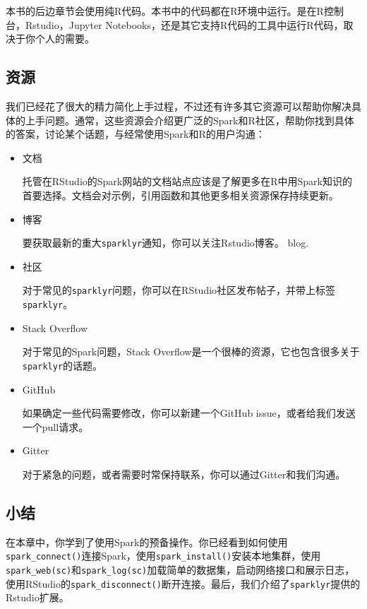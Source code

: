 \documentclass[
]{article}
\begin{document}
本书的后边章节会使用纯R代码。本书中的代码都在R环境中运行。是在R控制台，Rstudio，Jupyter
Notebooks，还是其它支持R代码的工具中运行R代码，取决于你个人的需要。

\hypertarget{ux8d44ux6e90}{%
\subsection{资源}\label{ux8d44ux6e90}}

我们已经花了很大的精力简化上手过程，不过还有许多其它资源可以帮助你解决具体的上手问题。通常，这些资源会介绍更广泛的Spark和R社区，帮助你找到具体的答案，讨论某个话题，与经常使用Spark和R的用户沟通：

\begin{itemize}
\item
  文档

  托管在RStudio的Spark网站的文档站点应该是了解更多在R中用Spark知识的首要选择。文档会对示例，引用函数和其他更多相关资源保存持续更新。
\item
  博客

  要获取最新的重大\texttt{sparklyr}通知，你可以关注Rstudio博客。 blog.
\item
  社区

  对于常见的\texttt{sparklyr}问题，你可以在RStudio社区发布帖子，并带上标签\texttt{sparklyr}。
\item
  Stack Overflow

  对于常见的Spark问题，Stack
  Overflow是一个很棒的资源，它也包含很多关于\texttt{sparklyr}的话题。
\item
  GitHub

  如果确定一些代码需要修改，你可以新建一个GitHub
  issue，或者给我们发送一个pull请求。
\item
  Gitter

  对于紧急的问题，或者需要时常保持联系，你可以通过Gitter和我们沟通。
\end{itemize}

\hypertarget{ux5c0fux7ed3-1}{%
\subsection{小结}\label{ux5c0fux7ed3-1}}

在本章中，你学到了使用Spark的预备操作。你已经看到如何使用\texttt{spark\_connect()}连接Spark，使用\texttt{spark\_install()}安装本地集群，使用\texttt{spark\_web(sc)}和\texttt{spark\_log(sc)}加载简单的数据集，启动网络接口和展示日志，使用RStudio的\texttt{spark\_disconnect()}断开连接。最后，我们介绍了\texttt{sparklyr}提供的Rstudio扩展。
\end{document}
